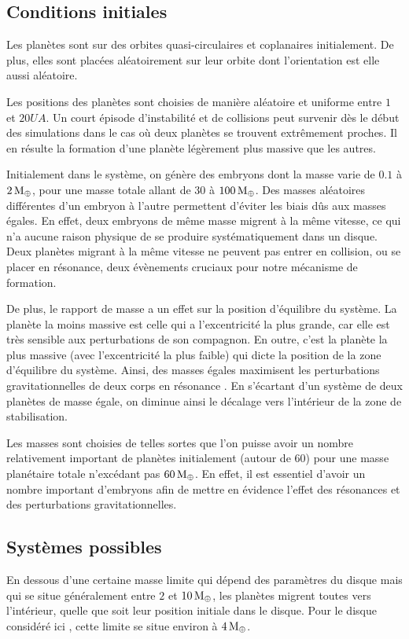 \subsection{Conditions initiales}
Les planètes sont sur des orbites quasi-circulaires et coplanaires initialement. De plus, elles sont placées aléatoirement sur leur orbite dont l'orientation est elle aussi aléatoire.

Les positions des planètes sont choisies de manière aléatoire et uniforme entre $1$ et $20\unit{UA}$. Un court épisode d'instabilité et de collisions peut survenir dès le début des simulations dans le cas où deux planètes se trouvent extrêmement proches. Il en résulte la formation d'une planète légèrement plus massive que les autres. 

Initialement dans le système, on génère des embryons dont la masse varie de $0.1$ à $2\mathrm{\thinspace M_\oplus}$, pour une masse totale allant de $30$ à $100\mathrm{\thinspace M_\oplus}$. Des masses aléatoires différentes d'un embryon à l'autre permettent d'éviter les biais dûs aux masses égales. En effet, deux embryons de même masse migrent à la même vitesse, ce qui n'a aucune raison physique de se produire systématiquement dans un disque. Deux planètes migrant à la même vitesse ne peuvent pas entrer en collision, ou se placer en résonance, deux évènements cruciaux pour notre mécanisme de formation. 

De plus, le rapport de masse a un effet sur la position d'équilibre du système. La planète la moins massive est celle qui a l'excentricité la plus grande, car elle est très sensible aux perturbations de son compagnon. En outre, c'est la planète la plus massive (avec l'excentricité la plus faible) qui dicte la position de la zone d'équilibre du système. Ainsi, des masses égales maximisent les perturbations gravitationnelles de deux corps en résonance . En s'écartant d'un système de deux planètes de masse égale, on diminue ainsi le décalage vers l'intérieur de la zone de stabilisation.

Les masses sont choisies de telles sortes que l'on puisse avoir un nombre relativement important de planètes initialement (autour de 60) pour une masse planétaire totale n'excédant pas $60\mathrm{\thinspace M_\oplus}$. En effet, il est essentiel d'avoir un nombre important d'embryons afin de mettre en évidence l'effet des résonances et des perturbations gravitationnelles. 

\subsection{Systèmes possibles}
En dessous d'une certaine masse limite qui dépend des paramètres du disque mais qui se situe généralement entre $2$ et $10\mathrm{\thinspace M_\oplus}$, les planètes migrent toutes vers l'intérieur, quelle que soit leur position initiale dans le disque. Pour le disque considéré ici , cette limite se situe environ à $4\mathrm{\thinspace M_\oplus}$.

